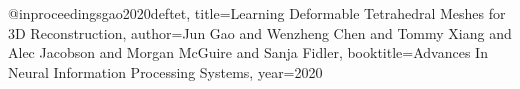 @inproceedings{gao2020deftet,
	title={Learning Deformable Tetrahedral Meshes for 3D Reconstruction},
	author={Jun Gao and Wenzheng Chen and Tommy Xiang and Alec Jacobson and Morgan McGuire and Sanja Fidler},
	booktitle={Advances In Neural Information Processing Systems},
	year={2020}
}
